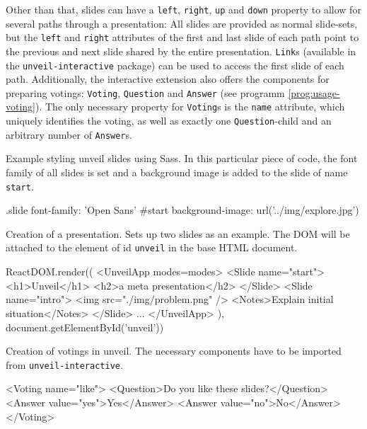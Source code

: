 Other than that, slides can have a \texttt{left}, \texttt{right}, \texttt{up} and \texttt{down} property to allow for several paths through a presentation: All slides are provided as normal slide-sets, but the \texttt{left} and \texttt{right} attributes of the first and last slide of each path point to the previous and next slide shared by the entire presentation. \texttt{Link}s (available in the \texttt{unveil-interactive} package) can be used to access the first slide of each path. Additionally, the interactive extension also offers the components for preparing votings: \texttt{Voting}, \texttt{Question} and \texttt{Answer} (see programm \ref{prog:usage-voting}). The only necessary property for \texttt{Voting}s is the \texttt{name} attribute, which uniquely identifies the voting, as well as exactly one \texttt{Question}-child and an arbitrary number of \texttt{Answer}s.

\begin{program}
\caption{Example styling unveil slides using Sass. In this particular piece of code, the font family of all slides is set and a background image is added to the slide of name \texttt{start}.}
\label{prog:usage-styling}
\begin{CssCode}
.slide
  font-family: 'Open Sans'
#start
  background-image: url('../img/explore.jpg')
\end{CssCode}
\end{program}

\begin{program}
\caption{Creation of a presentation. Sets up two slides as an example. The DOM will be attached to the element of id \texttt{unveil} in the base HTML document.}
\label{prog:usage-presentation-creation}
\begin{JsCode}
ReactDOM.render((
  <UnveilApp modes={modes}>
    <Slide name="start">
      <h1>Unveil</h1>
      <h2>a meta presentation</h2>
    </Slide>
    <Slide name="intro">
      <img src="./img/problem.png" />
      <Notes>Explain initial situation</Notes>
    </Slide>
    ...
  </UnveilApp>
), document.getElementById('unveil'))
\end{JsCode}
\end{program}


\begin{program}
\caption{Creation of votings in unveil. The necessary components have to be imported from \texttt{unveil-interactive}.}
\label{prog:usage-voting}
\begin{JsCode}
<Voting name="like">
  <Question>Do you like these slides?</Question>
  <Answer value="yes">Yes</Answer>
  <Answer value="no">No</Answer>
</Voting>
\end{JsCode}
\end{program}

